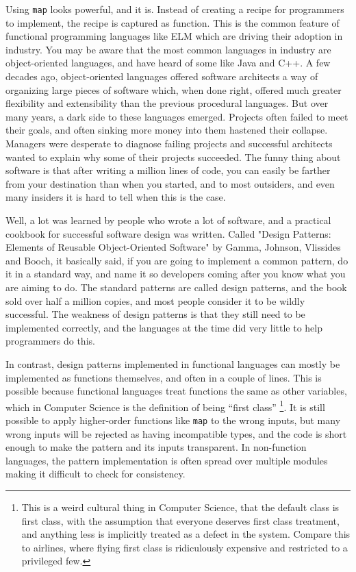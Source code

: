 \documentclass[12pt]{amsbook}
\begin{document}
Using \texttt{map} looks powerful, and it is.
Instead of creating a recipe for programmers to implement,
the recipe is captured as function.
This is the common feature of functional programming languages like ELM which are driving their adoption in industry.
You may be aware that the most common languages in industry are object-oriented languages, and have heard of some like Java and C++.
A few decades ago, object-oriented languages offered software architects a way of organizing large pieces of software which, when done right, 
offered much greater flexibility and extensibility than the previous procedural languages.
But over many years, a dark side to these languages emerged.  
Projects often failed to meet their goals, 
and often sinking more money into them hastened their collapse.
Managers were desperate to diagnose failing projects and successful architects wanted to explain why some of their projects succeeded.
The funny thing about software is that after writing a million lines of code, 
you can easily be farther from your destination than when you started,
and to most outsiders, and even many insiders it is hard to tell when this is the case.

Well, a lot was learned by people who wrote a lot of software, and a practical cookbook for successful software design was written.
Called "Design Patterns: Elements of Reusable Object-Oriented Software" by Gamma, Johnson, Vlissides and Booch, it basically said, if you are going to implement a common pattern, do it in a standard way, and name it so developers coming after you know what you are aiming to do.
The standard patterns are called design patterns,
and the book sold over half a million copies,
and most people consider it to be wildly successful.
The weakness of design patterns 
is that they still need to be implemented correctly,
and the languages at the time did very little to help programmers do this.

In contrast, design patterns implemented in functional languages can mostly be implemented as functions themselves,
and often in a couple of lines.
This is possible because functional languages treat functions the same as other variables,
which in Computer Science is the definition of being
``first class''%
\footnote{This is a weird cultural thing in Computer Science, that the default class is first class,
with the assumption that everyone deserves first class treatment, and anything less is implicitly treated as a defect in the system.
Compare this to airlines, where flying first class is  ridiculously expensive and restricted to a privileged few.
}.  
It is still possible to apply higher-order functions like \texttt{map} to the wrong inputs,
but many wrong inputs will be rejected as having incompatible types, 
and the code is short enough to make the pattern and its inputs transparent.
In non-function languages, the pattern implementation is often spread over multiple modules making it difficult to check for consistency.
\end{document}
